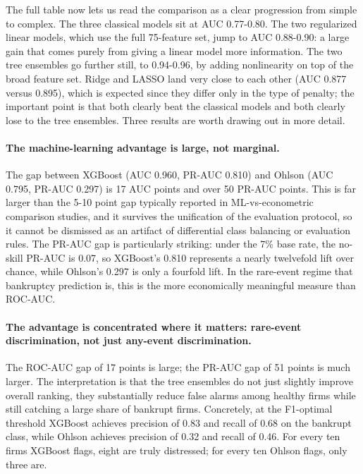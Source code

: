 \documentclass[12pt,a4paper]{article}
\begin{document}
The full table now lets us read the comparison as a clear progression from
simple to complex. The three classical models sit at AUC 0.77-0.80. The two
regularized linear models, which use the full 75-feature set, jump to AUC
0.88-0.90: a large gain that comes purely from giving a linear model more
information. The two tree ensembles go further still, to 0.94-0.96, by adding
nonlinearity on top of the broad feature set. Ridge and LASSO land very close
to each other (AUC 0.877 versus 0.895), which is expected since they differ
only in the type of penalty; the important point is that both clearly beat the
classical models and both clearly lose to the tree ensembles. Three results
are worth drawing out in more detail.

\paragraph{The machine-learning advantage is large, not marginal.} The gap
between XGBoost (AUC 0.960, PR-AUC 0.810) and Ohlson (AUC 0.795,
PR-AUC 0.297) is 17 AUC points and over 50 PR-AUC points. This is far
larger than the 5-10 point gap typically reported in ML-vs-econometric
comparison studies, and it survives the unification of the evaluation
protocol, so it cannot be dismissed as an artifact of differential class
balancing or evaluation rules. The PR-AUC gap is particularly striking: under
the 7\% base rate, the no-skill PR-AUC is 0.07, so XGBoost's 0.810 represents
a nearly twelvefold lift over chance, while Ohlson's 0.297 is only a
fourfold lift. In the rare-event regime that bankruptcy prediction is, this
is the more economically meaningful measure than ROC-AUC.

\paragraph{The advantage is concentrated where it matters: rare-event
discrimination, not just any-event discrimination.} The ROC-AUC gap of 17
points is large; the PR-AUC gap of 51 points is much larger. The
interpretation is that the tree ensembles do not just slightly improve
overall ranking, they substantially reduce false alarms among healthy
firms while still catching a large share of bankrupt firms. Concretely, at
the F1-optimal threshold XGBoost achieves precision of 0.83 and recall of
0.68 on the bankrupt class, while Ohlson achieves precision of 0.32 and
recall of 0.46. For every ten firms XGBoost flags, eight are truly distressed;
for every ten Ohlson flags, only three are.
\end{document}
